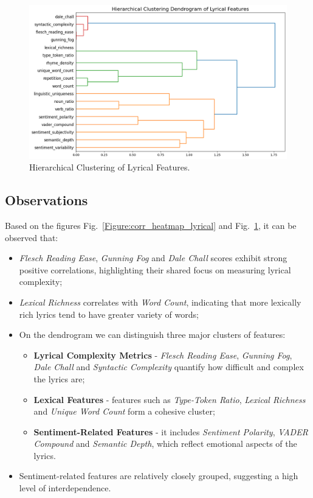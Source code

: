 \begin{center}
\begin{figure}[H]
  \centering
  \includegraphics[width=6in]{img/dendrogram_lyrical.png}
  \caption{Hierarchical Clustering of Lyrical Features.}
  \label{Figure:dendrogram_lyrical}
\end{figure}
\end{center}


\subsection*{Observations}
Based on the figures Fig.~\ref{Figure:corr_heatmap_lyrical} and
Fig.~\ref{Figure:dendrogram_lyrical}, it can be observed that:
\begin{itemize}
  \item \textit{Flesch Reading Ease}, \textit{Gunning Fog} and \textit{Dale
    Chall} scores exhibit strong positive correlations, highlighting their
    shared focus on measuring lyrical complexity;
  \item \textit{Lexical Richness} correlates with \textit{Word Count},
    indicating that more lexically rich lyrics tend to have  greater variety
    of words;
  \item On the dendrogram we can distinguish three major clusters of features:
    \begin{itemize}
      \item \textbf{Lyrical Complexity Metrics} - \textit{Flesch Reading Ease},
        \textit{Gunning Fog}, \textit{Dale Chall} and \textit{Syntactic
        Complexity } quantify how difficult and complex the lyrics are;
      \item  \textbf{Lexical Features} - features such as \textit{Type-Token
        Ratio}, \textit{Lexical Richness} and \textit{Unique Word Count} form a
        cohesive cluster;
      \item \textbf{Sentiment-Related Features} - it includes \textit{Sentiment
        Polarity}, \textit{VADER Compound} and \textit{Semantic Depth}, which
        reflect emotional aspects of the lyrics.
    \end{itemize}
  \item Sentiment-related features are relatively closely grouped, suggesting a
    high level of interdependence.
\end{itemize}


